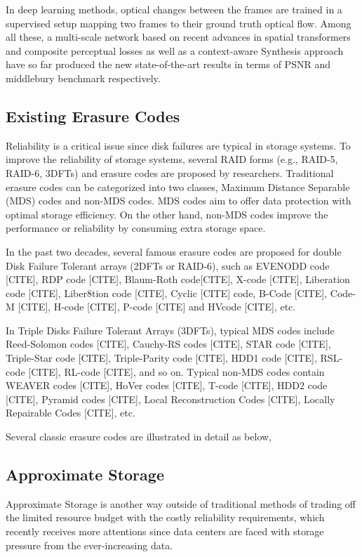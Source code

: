 \documentclass[sigconf]{acmart}
\begin{document}
In deep learning methods, optical changes between the frames are trained in a supervised setup mapping two frames to their ground truth optical flow. Among all these, a multi-scale network\cite{van2017frame} based on recent advances in spatial transformers and composite perceptual losses as well as a context-aware Synthesis approach\cite{niklaus2018context} have so far produced the new state-of-the-art results in terms of PSNR and middlebury benchmark respectively.


\subsection{Existing Erasure Codes}\label{existEC}
Reliability is a critical issue since disk failures are typical in storage systems. To improve the reliability of storage systems, several RAID forms (e.g., RAID-5, RAID-6, 3DFTs) and erasure codes are proposed by researchers.  Traditional erasure codes can be categorized into two classes, Maximum Distance Separable (MDS) codes and non-MDS codes. MDS codes aim to offer data protection with optimal storage efficiency. On the other hand, non-MDS codes improve the performance or reliability by consuming extra storage space.

In the past two decades, several
famous erasure codes are proposed for double Disk Failure Tolerant arrays (2DFTs or RAID-6), such as EVENODD code [CITE], RDP code [CITE], Blaum-Roth code[CITE], X-code [CITE], Liberation code [CITE], Liber8tion code [CITE], Cyclic [CITE] code, B-Code [CITE], Code-M [CITE], H-code [CITE], P-code [CITE] and HVcode [CITE], etc.

In Triple Disks Failure Tolerant Arrays (3DFTs), typical MDS codes include Reed-Solomon codes [CITE], Cauchy-RS codes [CITE], STAR code [CITE], Triple-Star code [CITE], Triple-Parity code [CITE], HDD1 code [CITE], RSL-code [CITE], RL-code [CITE], and so on. Typical non-MDS codes contain WEAVER codes [CITE], HoVer
codes [CITE], T-code [CITE], HDD2 code [CITE], Pyramid codes [CITE], Local Reconstruction Codes [CITE], Locally Repairable Codes [CITE], etc.

Several classic erasure codes are illustrated in detail as below,


\subsection{Approximate Storage}
Approximate Storage is another way outside of traditional methods of trading off the limited resource budget with the costly reliability requirements, which recently receives more attentions since data centers are faced with storage pressure from the ever-increasing data.
\end{document}
